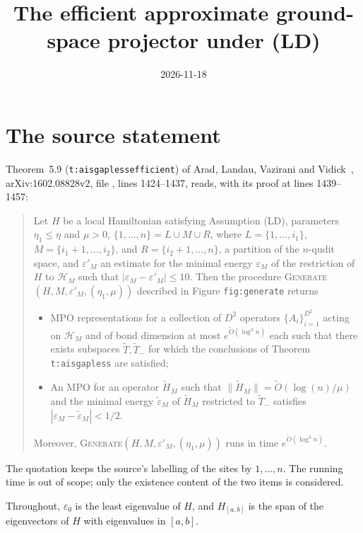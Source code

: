 \documentclass{article}
\title{The efficient approximate ground-space projector under (LD)}
\author{}
\date{2026-11-18}
\begin{document}
\maketitle
{}

\section{The source statement}

Theorem~5.9 (\texttt{t:aisgaplessefficient}) of Arad, Landau, Vazirani and
Vidick~\cite{Arad2016RigorousRG}, arXiv:1602.08828v2, file
, lines 1424--1437, reads, with its proof at
lines 1439--1457:
\begin{quote}
Let $H$ be a local Hamiltonian satisfying Assumption (LD), parameters
$\eta_1\leq \eta$ and $\mu>0$, $\{1,\ldots,n\} = L\cup M\cup R$, where
$L=\{1,\ldots,i_1\}$, $M=\{i_1+1,\ldots,i_2\}$, and $R=\{i_2+1,\ldots,n\}$, a
partition of the $n$-qudit space, and $\varepsilon'_M$ an estimate for the
minimal energy $\varepsilon_M$ of the restriction of $H$ to $\mathcal H_M$
such that $|\varepsilon_M-\varepsilon'_M|\leq 10$. Then the procedure
\textsc{Generate}$(H, M, \varepsilon'_M,(\eta_1,\mu))$ described in Figure
\texttt{fig:generate} returns
\begin{itemize}
 \item MPO representations for a collection of $D^2$ operators
  $\{A_i\}_{i=1}^{D^2}$ acting on $\mathcal H_M$ and of bond dimension at most
  $e^{\tilde O(\log^3 n)}$ each such that there exists subspaces
  $\tilde T,\tilde T_-$ for which the conclusions of Theorem
  \texttt{t:aisgapless} are satisfied;
 \item An MPO for an operator $\tilde H_M$ such that
  $\|\tilde H_M\| = \tilde O(\log(n)/\mu)$ and the minimal energy
  $\tilde\varepsilon_M$ of $\tilde H_M$ restricted to $\tilde T_-$ satisfies
  $|\varepsilon_M-\tilde\varepsilon_M|<1/2$.
\end{itemize}
Moreover, \textsc{Generate}$(H, M, \varepsilon'_M, (\eta_1,\mu))$ runs in time
$e^{\tilde O(\log^3 n)}$.
\end{quote}
The quotation keeps the source's labelling of the sites by $1,\ldots,n$. The
running time is out of scope; only the existence content of the two items is
considered.

Throughout, $\varepsilon_0$ is the least eigenvalue of $H$, and $H_{[a,b]}$ is
the span of the eigenvectors of $H$ with eigenvalues in $[a,b]$.
\end{document}
